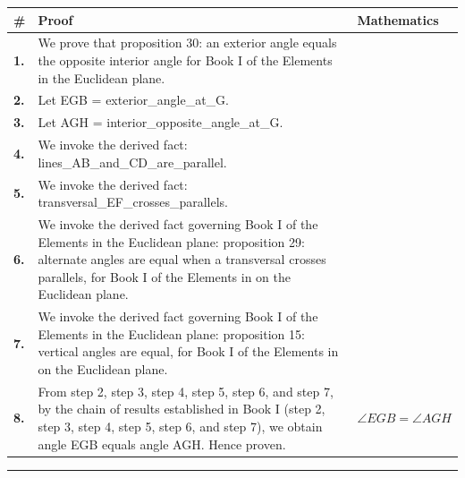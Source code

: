 \documentclass[11pt]{article}
\theoremstyle{definition}
\begin{document}
\begin{tabular}{@{} >{\raggedright\arraybackslash}p{} >{\raggedright\arraybackslash}p{} >{\raggedleft\arraybackslash}p{} @{}}
\textbf{\#} & \textbf{Proof} & \textbf{Mathematics} \\
\midrule
\textbf{1.} & We prove that proposition 30: an exterior angle equals the opposite interior angle for Book I of the Elements in the Euclidean plane. & \\[0.45em]
\textbf{2.} & Let EGB = exterior\_angle\_at\_G. & \\[0.45em]
\textbf{3.} & Let AGH = interior\_opposite\_angle\_at\_G. & \\[0.45em]
\textbf{4.} & We invoke the derived fact: lines\_AB\_and\_CD\_are\_parallel. & \\[0.45em]
\textbf{5.} & We invoke the derived fact: transversal\_EF\_crosses\_parallels. & \\[0.45em]
\textbf{6.} & We invoke the derived fact governing Book I of the Elements in the Euclidean plane: proposition 29: alternate angles are equal when a transversal crosses parallels, for Book I of the Elements in on the Euclidean plane. & \\[0.45em]
\textbf{7.} & We invoke the derived fact governing Book I of the Elements in the Euclidean plane: proposition 15: vertical angles are equal, for Book I of the Elements in on the Euclidean plane. & \\[0.45em]
\textbf{8.} & From step 2, step 3, step 4, step 5, step 6, and step 7, by the chain of results established in Book I (step 2, step 3, step 4, step 5, step 6, and step 7), we obtain angle EGB equals angle AGH. Hence proven. & $\displaystyle \angle EGB = \angle AGH$ \\[0.45em]
\bottomrule
\end{tabular}
\label{thm:Geometry-Euclid Book I-proposition_30_an_exterior_angle_equals_the_opposite_interior_angle}
\par\medskip\hrule
\end{document}
